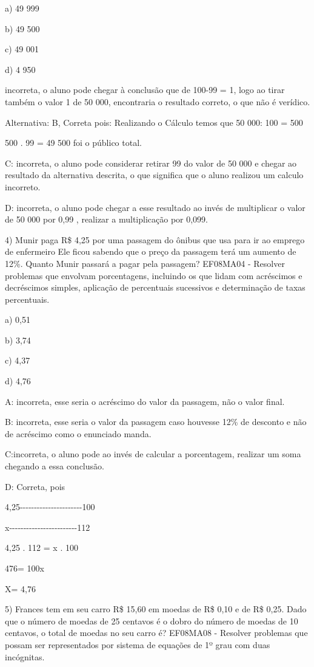a) 49 999

b) 49 500

c) 49 001

d) 4 950

incorreta, o aluno pode chegar à conclusão que de 100-99 = 1, logo ao
tirar também o valor 1 de 50 000, encontraria o resultado correto, o que
não é verídico.

Alternativa: B, Correta pois: Realizando o Cálculo temos que 50 000: 100
= 500

500 . 99 = 49 500 foi o público total.

C: incorreta, o aluno pode considerar retirar 99 do valor de 50 000 e
chegar ao resultado da alternativa descrita, o que significa que o aluno
realizou um calculo incorreto.

D: incorreta, o aluno pode chegar a esse resultado ao invés de
multiplicar o valor de 50 000 por 0,99 , realizar a multiplicação por
0,099.

4) Munir paga R\$ 4,25 por uma passagem do ônibus que usa para ir ao
emprego de enfermeiro Ele ficou sabendo que o preço da passagem terá um
aumento de 12\%. Quanto Munir passará a pagar pela passagem? EF08MA04 -
Resolver problemas que envolvam porcentagens, incluindo os que lidam com
acréscimos e decréscimos simples, aplicação de percentuais sucessivos e
determinação de taxas percentuais.

a) 0,51

b) 3,74

c) 4,37

d) 4,76

A: incorreta, esse seria o acréscimo do valor da passagem, não o valor
final.

B: incorreta, esse seria o valor da passagem caso houvesse 12\% de
desconto e não de acréscimo como o enunciado manda.

C:incorreta, o aluno pode ao invés de calcular a porcentagem, realizar
um soma chegando a essa conclusão.

D: Correta, pois

4,25-\/-\/-\/-\/-\/-\/-\/-\/-\/-\/-\/-\/-\/-\/-\/-\/-\/-\/-\/-\/-\/-100

x-\/-\/-\/-\/-\/-\/-\/-\/-\/-\/-\/-\/-\/-\/-\/-\/-\/-\/-\/-\/-\/-\/-\/-112

4,25 . 112 = x . 100

476= 100x

X= 4,76

5) Frances tem em seu carro R\$ 15,60 em moedas de R\$ 0,10 e de R\$
0,25. Dado que o número de moedas de 25 centavos é o dobro do número de
moedas de 10 centavos, o total de moedas no seu carro é? EF08MA08 -
Resolver problemas que possam ser representados por sistema de equações
de 1º grau com duas incógnitas.

